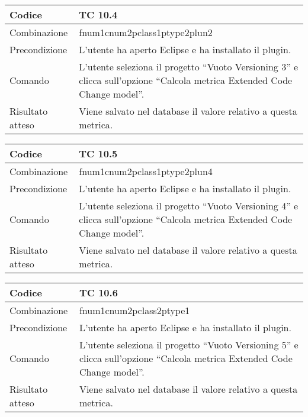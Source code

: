 \begin{table}[ht]
\begin{tabular}{|p{3cm}|p{9cm}|}
\hline
\cellcolor{lightgray}Codice				& TC 10.4								\\
\hline
\cellcolor{lightgray}Combinazione		& fnum1cnum2pclass1ptype2plun2									\\
\hline
\cellcolor{lightgray}Precondizione		& L'utente ha aperto Eclipse e ha installato il plugin.		\\
\hline
\cellcolor{lightgray}Comando			& L'utente seleziona il progetto ``Vuoto Versioning 3''  e clicca sull'opzione ``Calcola metrica Extended Code Change model''.	\\
\hline
\cellcolor{lightgray}Risultato atteso	& Viene salvato nel database il valore relativo a questa metrica.\\
\hline
\end{tabular}
\end{table}


\begin{table}[ht]
\begin{tabular}{|p{3cm}|p{9cm}|}
\hline
\cellcolor{lightgray}Codice				& TC 10.5								\\
\hline
\cellcolor{lightgray}Combinazione		& fnum1cnum2pclass1ptype2plun4									\\
\hline
\cellcolor{lightgray}Precondizione		& L'utente ha aperto Eclipse e ha installato il plugin.		\\
\hline
\cellcolor{lightgray}Comando			& L'utente seleziona il progetto ``Vuoto Versioning 4''  e clicca sull'opzione ``Calcola metrica Extended Code Change model''.	\\
\hline
\cellcolor{lightgray}Risultato atteso	& Viene salvato nel database il valore relativo a questa metrica.\\
\hline
\end{tabular}
\end{table}


\begin{table}[ht]
\begin{tabular}{|p{3cm}|p{9cm}|}
\hline
\cellcolor{lightgray}Codice				& TC 10.6								\\
\hline
\cellcolor{lightgray}Combinazione		& fnum1cnum2pclass2ptype1									\\
\hline
\cellcolor{lightgray}Precondizione		& L'utente ha aperto Eclipse e ha installato il plugin.		\\
\hline
\cellcolor{lightgray}Comando			& L'utente seleziona il progetto ``Vuoto Versioning 5''  e clicca sull'opzione ``Calcola metrica Extended Code Change model''.	\\
\hline
\cellcolor{lightgray}Risultato atteso	& Viene salvato nel database il valore relativo a questa metrica.\\
\hline
\end{tabular}
\end{table}

